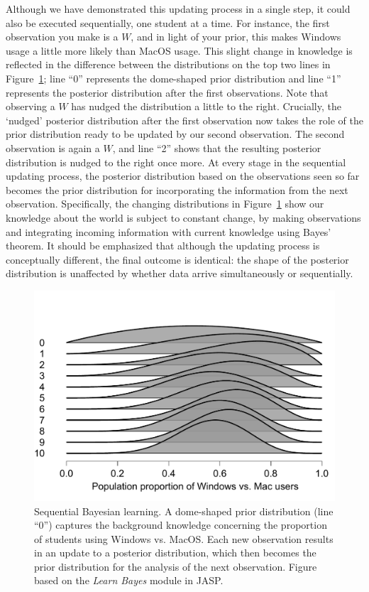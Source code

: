 \documentclass[man]{apa7}
\begin{document}
Although we have demonstrated this updating process in a single step, it could also be executed sequentially, one student at a time. For instance, the first observation you make is a $W$, and in light of your prior, this makes Windows usage a little more likely than MacOS usage. This slight change in knowledge is reflected in the difference between the distributions on the top two lines in Figure~\ref{fig:WindowsMacSequential}; line ``0'' represents the dome-shaped prior distribution and line ``1'' represents the posterior distribution after the first observations. Note that observing a $W$ has nudged the distribution a little to the right. Crucially, the `nudged' posterior distribution after the first observation now takes the role of the prior distribution ready to be updated by our second observation. The second observation is again a $W$, and line ``2'' shows that the resulting posterior distribution is nudged to the right once more. At every stage in the sequential updating process, the posterior distribution based on the observations seen so far becomes the prior distribution for incorporating the information from the next observation. Specifically, the changing distributions in Figure~\ref{fig:WindowsMacSequential} show our knowledge about the world is subject to constant change, by making observations and integrating incoming information with current knowledge using Bayes' theorem. It should be emphasized that although the updating process is conceptually different, the final outcome is identical: the shape of the posterior distribution is unaffected by whether data arrive simultaneously or sequentially. \\

\begin{figure}[h]
\begin{center}
\includegraphics[width = .65\paperwidth]{WindowsMacSequential.pdf}
\caption{Sequential Bayesian learning. A dome-shaped prior distribution (line ``0'') captures the background knowledge concerning the proportion of students using Windows vs. MacOS. Each new observation results in an update to a posterior distribution, which then becomes the prior distribution for the analysis of the next observation. Figure based on the \emph{Learn Bayes} module in JASP.}
\label{fig:WindowsMacSequential}
\end{center}
\end{figure}
\end{document}
